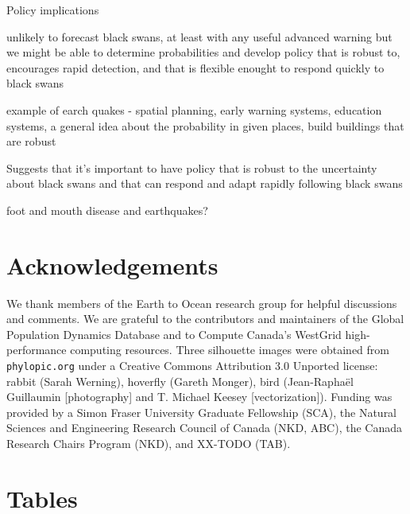 Policy implications

unlikely to forecast black swans, at least with any useful advanced warning
but we might be able to determine probabilities
and develop policy that is robust to, encourages rapid detection, and that is flexible enought to respond quickly to black swans

example of earch quakes - spatial planning, early warning systems, education systems, a general idea about the probability in given places, build buildings that are robust

Suggests that it's important to have policy that is robust to the uncertainty
about black swans and that can respond and adapt rapidly following black swans

foot and mouth disease and earthquakes?

\section{Acknowledgements}

We thank members of the Earth to Ocean research group for helpful discussions
and comments. We are grateful to the contributors and maintainers of the Global
Population Dynamics Database and to Compute Canada's WestGrid high-performance
computing resources. Three silhouette images were obtained from
\texttt{phylopic.org} under a Creative Commons Attribution 3.0 Unported
license: rabbit (Sarah Werning), hoverfly (Gareth Monger), bird (Jean-Raphaël
Guillaumin {[}photography{]} and T. Michael Keesey {[}vectorization{]}).
Funding was provided by a Simon Fraser University Graduate Fellowship (SCA),
the Natural Sciences and Engineering Research Council of Canada (NKD, ABC), the
Canada Research Chairs Program (NKD), and XX-TODO (TAB).




\clearpage

\section{Tables}



